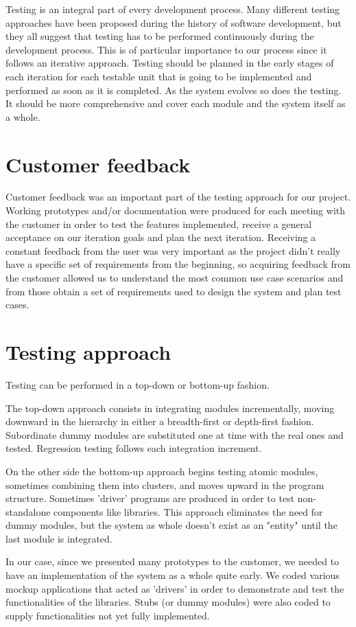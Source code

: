 
Testing is an integral part of every development process.
Many different testing approaches have been proposed during the history of
software development, but they all suggest that testing has to be performed
continuously during the development process. This is of particular importance to
our process since it follows an iterative approach. Testing should be planned in
the early stages of each iteration for each testable unit that is going to be
implemented and performed as soon as it is completed. As the system evolves so
does the testing. It should be more comprehensive and cover each module and the
system itself as a whole.

\section{Customer feedback}
Customer feedback was an important part of the testing approach for our project.
Working prototypes and/or documentation were produced for each meeting with the
customer in order to test the features implemented, receive a general acceptance
on our iteration goals and plan the next iteration. Receiving a constant
feedback from the user was very important as the project didn't really have a
specific set of requirements from the beginning, so acquiring feedback from the
customer allowed us to understand the most common use case scenarios and from
those obtain a set of requirements used to design the system and plan test cases.

\section{Testing approach}
Testing can be performed in a top-down or bottom-up fashion.

The top-down approach consists in integrating modules incrementally, moving
downward in the hierarchy in either a breadth-first or depth-first fashion.
Subordinate dummy modules are substituted one at time with the real ones and
tested. Regression testing follows each integration increment.

On the other side the bottom-up approach begins testing atomic modules,
sometimes combining them into clusters, and moves upward in the program
structure. Sometimes 'driver' programs are produced in order to test
non-standalone components like libraries. This approach eliminates the need for
dummy modules, but the system as whole doesn't exist as an "entity" until the
last module is integrated.

In our case, since we presented many prototypes to the customer, we needed to
have an implementation of the system as a whole quite early. We coded various
mockup applications that acted as 'drivers' in order to demonstrate and test the
functionalities of the libraries. Stubs (or dummy modules) were also coded
to supply functionalities not yet fully implemented.

